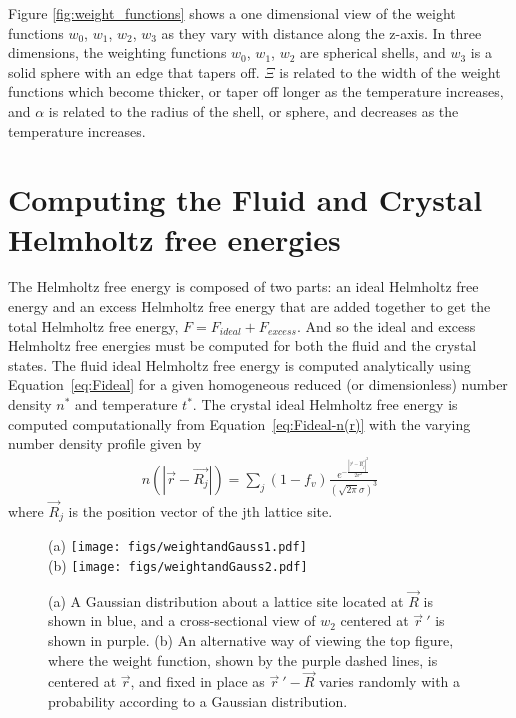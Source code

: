 \documentclass[double,12pt]{beavtex}
\begin{document}


Figure \ref{fig:weight_functions} shows a one dimensional view of the 
weight functions $w_0$, $w_1$, $w_2$, $w_3$ as they vary with distance 
along the z-axis. In three dimensions, the weighting functions 
$w_0$, $w_1$, $w_2$ are spherical shells, 
and $w_3$ is a solid sphere with an edge that tapers off.
$\Xi$ is related to the width of the weight functions which 
become thicker, or taper off longer as the temperature increases, and 
$\alpha$ is related to the radius of the shell, or sphere, and decreases 
as the temperature increases.

\section{Computing the Fluid and Crystal Helmholtz free energies}
The Helmholtz free energy is composed of two parts: an ideal Helmholtz free energy 
and an excess Helmholtz free energy that are added together to get the total
Helmholtz free energy, $F=F_{ideal} + F_{excess}$. 
And so the ideal and excess Helmholtz free energies
must be computed for both the fluid and the crystal states.
The fluid ideal Helmholtz free energy is computed analytically 
using Equation~\ref{eq:Fideal} for a given homogeneous reduced 
(or dimensionless) number density $n^*$ and temperature $t^*$. 
The crystal ideal Helmholtz free energy is computed computationally 
from Equation~\ref{eq:Fideal-n(r)} with the varying number density profile given by
\begin{align}
  n(|\vec{r}-\vec{R_j}|)=\sum_j{(1-f_v)\frac{e^{-\frac{{|\vec{r}-\vec{R_j}|}^2}{2{\sigma}^2}}}{\left(\sqrt{2\pi}\sigma\right)^3}}
\end{align}
where $\vec R_j$ is the position vector of the jth lattice site.

\begin{figure}
  \centering
  (a) \texttt{[image: figs/weightandGauss1.pdf]}\\
  (b) \texttt{[image: figs/weightandGauss2.pdf]}
  \caption{(a) A Gaussian distribution about a lattice site located at 
  $\vec R$ is shown in blue, and a cross-sectional 
  view of $w_2$ centered at $\vec r~'$ is shown in purple.
  (b) An alternative way of viewing the top figure, where 
  the weight function, shown by the purple dashed lines, is centered at $\vec{r}$,  
  and fixed in place as $\vec r~' - \vec R$
  varies randomly with a probability according to a Gaussian distribution.}
\label{fig:GaussandW2_actual}
\end{figure} 
\end{document}
